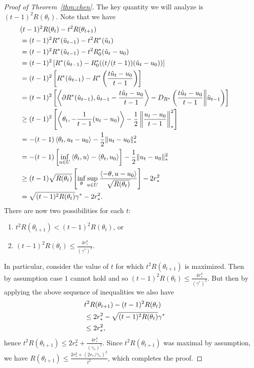 \documentclass[paper.tex]{subfiles}
\begin{document}
\begin{proof}[Proof of Theorem~\ref{thm:chen}]
The key quantity we will analyze is $(t-1)^2R(\theta_t)$. Note that we have
\begin{align*}
\lefteqn{(t-1)^2R(\theta_t) - t^2R(\theta_{t+1})} \\
 &= (t-1)^2R^*(\hat{u}_{t-1})-t^2R^*(\hat{u}_t) \\
 &= (t-1)^2R^*(\hat{u}_{t-1})-t^2R_0^*(\hat{u}_t-u_{0}) \\
 &= (t-1)^2\left[R^*(\hat{u}_{t-1})-R_0^*((t/(t-1))(\hat{u}_t-u_{0}))\right] \\
 &= (t-1)^2\left[R^*(\hat{u}_{t-1})-R^*\left(\frac{t\hat{u}_t-u_{0}}{t-1}\right)\right] \\
 &= (t-1)^2\left[\ip{\partial R^*(\hat{u}_{t-1})}{\hat{u}_{t-1}-\frac{t\hat{u}_t-u_{0}}{t-1}}-D_{R^*}\left(\frac{t\hat{u}_t-u_{0}}{t-1} \middle\| \hat{u}_{t-1}\right)\right] \\
 &\geq (t-1)^2\left[\ip{\theta_t}{-\frac{1}{t-1}(u_t-u_{0})}-\frac{1}{2}\left\|\frac{u_t-u_{0}}{t-1}\right\|_*^2\right] \\
 &= -(t-1)\ip{\theta_t}{u_t-u_{0}}-\frac{1}{2}\|u_t-u_{0}\|_*^2 \\
 &= -(t-1)\left[\inf_{u \in U} \ip{\theta_t}{u} - \ip{\theta_t}{u_{0}}\right]-\frac{1}{2}\|u_t-u_{0}\|_*^2 \\
 &\geq (t-1)\sqrt{R(\theta_t)}\left[\inf_{\theta} \sup_{u \in U} \frac{\ip{-\theta}{u-u_0}}{\sqrt{R(\theta_t)}}\right]-2r_*^2 \\
 &= \sqrt{(t-1)^2R(\theta_t)}\gamma^*-2r_*^2.
\end{align*}
There are now two possibilities for each $t$:
\begin{enumerate}
\item $t^2R(\theta_{t+1}) < (t-1)^2R(\theta_t)$, or
\item $(t-1)^2R(\theta_t) \leq \frac{4r_*^4}{(\gamma^*)^2}$.
\end{enumerate}
In particular, consider the value of $t$ for which 
$t^2R(\theta_{t+1})$ is maximized. Then by assumption 
case $1$ cannot hold and so $(t-1)^2R(\theta_t) \leq \frac{4r_*^4}{(\gamma^*)^2}$.
But then by applying the above sequence of inequalities 
we also have 
\begin{align*}
\lefteqn{t^2R(\theta_{t+1}) - (t-1)^2R(\theta_t)} \\
 &\leq 2r_*^2 - \sqrt{(t-1)^2R(\theta_t)}\gamma^* \\
 &\leq 2r_*^2,
\end{align*}
hence $t^2R(\theta_{t+1}) \leq 2r_*^2 + \frac{4r_*^4}{(\gamma_*)^2}$. 
Since $t^2R(\theta_{t+1})$ was maximal by assumption, we have
$R(\theta_{t+1}) \leq \frac{2r_*^2+(2r_*/\gamma_*)^2}{t^2}$, which 
completes the proof.
\end{proof}
\end{document}
